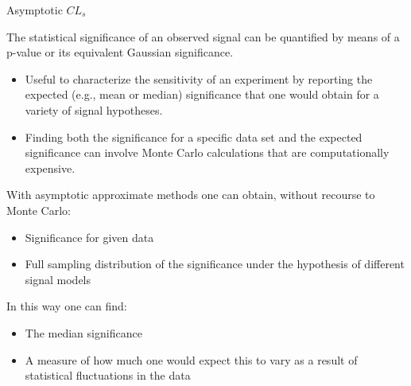 \documentclass[8pt]{beamer}
\begin{document}
\begin{frame}{Asymptotic $CL_s$}

The statistical significance of an observed signal can be quantified by means of a p-value or its equivalent Gaussian significance.

\begin{block}
 
\begin{itemize}
 \item Useful to characterize the sensitivity of an experiment by reporting the expected (e.g., mean or median) significance that one would obtain for a variety of signal hypotheses.
 \item Finding both the significance for a specific data set and the expected significance can involve Monte Carlo calculations that are computationally expensive. 
\end{itemize}

\end{block}

With asymptotic approximate methods one can obtain, without recourse to Monte Carlo:

\begin{block}
 
\begin{itemize}
 \item Significance for given data 
 \item Full sampling distribution of the significance under the hypothesis of different signal models
\end{itemize}

In this way one can find:
\begin{itemize}
 \item The median significance
 \item A measure of how much one would expect this to vary as a result of statistical fluctuations in the data
\end{itemize}
 
\end{block}

\end{frame}
\end{document}
